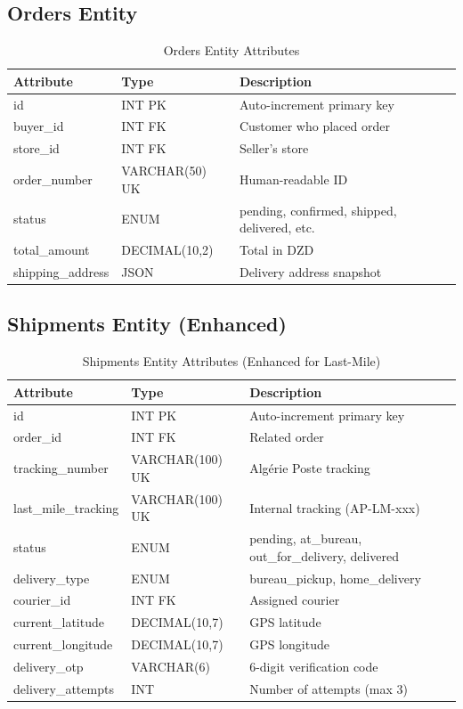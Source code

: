 \documentclass[12pt,a4paper]{report}
\begin{document}
\subsection{Orders Entity}

\begin{table}[h]
\centering
\begin{tabular}{llp{6cm}}
\toprule
\textbf{Attribute} & \textbf{Type} & \textbf{Description} \\
\midrule
id & INT PK & Auto-increment primary key \\
buyer\_id & INT FK & Customer who placed order \\
store\_id & INT FK & Seller's store \\
order\_number & VARCHAR(50) UK & Human-readable ID \\
status & ENUM & pending, confirmed, shipped, delivered, etc. \\
total\_amount & DECIMAL(10,2) & Total in DZD \\
shipping\_address & JSON & Delivery address snapshot \\
\bottomrule
\end{tabular}
\caption{Orders Entity Attributes}
\end{table}

\subsection{Shipments Entity (Enhanced)}

\begin{table}[h]
\centering
\begin{tabular}{llp{6cm}}
\toprule
\textbf{Attribute} & \textbf{Type} & \textbf{Description} \\
\midrule
id & INT PK & Auto-increment primary key \\
order\_id & INT FK & Related order \\
tracking\_number & VARCHAR(100) UK & Algérie Poste tracking \\
last\_mile\_tracking & VARCHAR(100) UK & Internal tracking (AP-LM-xxx) \\
status & ENUM & pending, at\_bureau, out\_for\_delivery, delivered \\
delivery\_type & ENUM & bureau\_pickup, home\_delivery \\
courier\_id & INT FK & Assigned courier \\
current\_latitude & DECIMAL(10,7) & GPS latitude \\
current\_longitude & DECIMAL(10,7) & GPS longitude \\
delivery\_otp & VARCHAR(6) & 6-digit verification code \\
delivery\_attempts & INT & Number of attempts (max 3) \\
\bottomrule
\end{tabular}
\caption{Shipments Entity Attributes (Enhanced for Last-Mile)}
\end{table}
\end{document}
